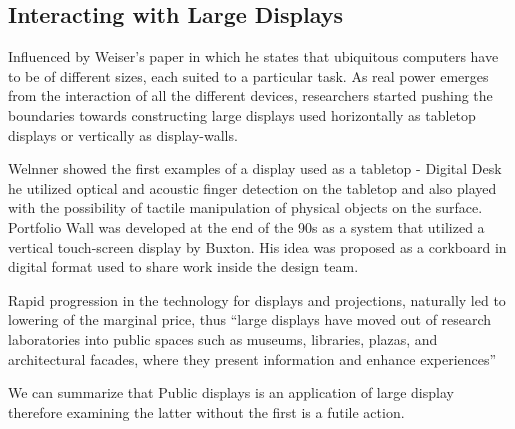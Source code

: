 \subsection{Interacting with Large Displays}
Influenced by Weiser's paper \cite{Weiser:1991} in which he states that ubiquitous computers have to be of different sizes, each suited to a particular task. 
As real power emerges from the interaction of all the different devices, researchers started pushing the boundaries towards constructing large displays used horizontally as tabletop displays or vertically as display-walls.
 
Welnner showed the first examples of a display used as a tabletop -  Digital Desk\cite{Wellner:1993} he utilized optical and acoustic finger detection on the tabletop and also played with the possibility of tactile manipulation of physical objects on the surface. Portfolio Wall was developed at the end of the 90s as a system that utilized a vertical touch-screen display by Buxton\cite{Buxton:2000}. His idea was proposed as a corkboard in digital format used to share work inside the design team.

Rapid progression in the technology for displays and projections, naturally led to lowering of the marginal price, thus ``large displays have moved out of research laboratories into public spaces such as museums, libraries, plazas, and architectural facades, where they present information and enhance experiences'' \cite{Hinrichs:2013:IPD:2478559.2478965}

We can summarize that Public displays is an application of large display therefore examining the latter without the first is a futile action.